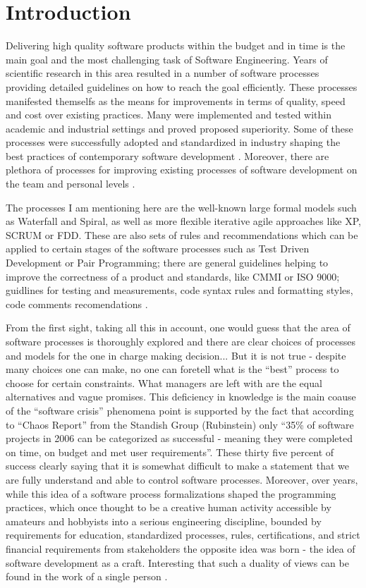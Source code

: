 \chapter{Introduction}
Delivering high quality software products within the budget and in time is the main goal and the most 
challenging task of Software Engineering. Years of scientific research in this area resulted in a 
number of software processes providing detailed guidelines on how to reach 
the goal efficiently. These processes manifested themselfs as the means for improvements in terms 
of quality, speed and cost over existing practices. Many were implemented and tested within academic 
and industrial settings and proved proposed superiority. Some of these processes were successfully 
adopted and standardized in industry shaping the best practices of contemporary software development 
\cite{citeulike:9962021}. Moreover, there are plethora of processes for improving existing processes 
of software development on the team \cite{citeulike:9962027} and personal 
levels \cite{citeulike:9962022}.

The processes I am mentioning here are the well-known large formal models such as Waterfall and Spiral, 
as well as more flexible iterative agile approaches like XP, SCRUM or FDD. These are also sets of 
rules and recommendations which can be applied to certain stages of the software processes 
such as Test Driven Development or Pair Programming; there are general guidelines helping 
to improve the correctness of a product and standards, like CMMI or ISO 9000; guidlines for testing 
and measurements, code syntax rules and formatting styles, code comments 
recomendations \cite{citeulike:900855}. 

From the first sight, taking all this in account,  one would guess that 
the area of software processes is thoroughly explored and there are clear choices of processes 
and models for the one in charge making decision... But it is not true - despite many choices 
one can make, no one can foretell what is the ``best'' process to choose for certain constraints.
What managers are left with are the equal alternatives and vague promises. 
This deficiency in knowledge is the main coause of the ``software crisis'' phenomena point is supported by the fact that according to ``Chaos Report'' from the Standish 
Group (Rubinstein) \cite{SDTimes} only ``35\% of software projects in 2006 can be categorized as successful - meaning 
they were completed on time, on budget and met user requirements''. 
These thirty five percent of success clearly saying that it is somewhat difficult to make 
a statement that we are fully understand and able to control software processes. 
Moreover, over years, while this idea of a software process formalizations shaped the 
programming practices, which once thought to be a creative human activity accessible by amateurs 
and hobbyists \cite{citeulike:9958822} into a serious engineering discipline, bounded 
by requirements for education, standardized processes, rules, certifications, and strict 
financial requirements from stakeholders the opposite idea was born - the idea of 
software development as a craft. Interesting that such a duality of views can be found 
in the work of a single person \cite{citeulike:5203446}.


